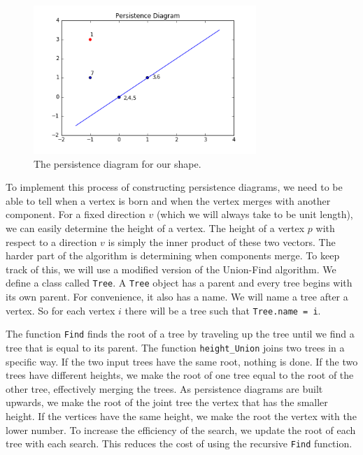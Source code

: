 \documentclass[codesnippet]{jss}
\begin{document}
\begin{figure}
\centering
\includegraphics[width = 0.75\textwidth]{../diagram.png}
\caption{\label{diagram} The persistence diagram for our shape.}
\end{figure}


To implement this process of constructing persistence diagrams, we need to be able to tell when a vertex is born and when the vertex merges with another component.  For a fixed direction $v$ (which we will always take to be unit length), we can easily determine the height of a vertex. The height of a vertex $p$ with respect to a direction $v$ is simply the inner product of these two vectors.  The harder part of the algorithm is determining when components merge.  To keep track of this, we will use a modified version of the Union-Find algorithm.  We define a class called \texttt{Tree}.  A \texttt{Tree} object has a parent and every tree begins with its own parent.  For convenience, it also has a name.  We will name a tree after a vertex.  So for each vertex $i$ there will be a tree such that \texttt{Tree.name = i}.  

The function \texttt{Find} finds the root of a tree by traveling up the tree until we find a tree that is equal to its parent.  The function \texttt{height\_Union} joins two trees in a specific way.  If the two input trees have the same root, nothing is done.  If the two trees have different heights, we make the root of one tree equal to the root of the other tree, effectively merging the trees.  As persistence diagrams are built upwards, we make the root of the joint tree the vertex that has the smaller height. If the vertices have the same height, we make the root the vertex with the lower number.  To increase the efficiency of the search, we update the root of each tree with each search. This reduces the cost of using the recursive \texttt{Find} function.  
\end{document}
